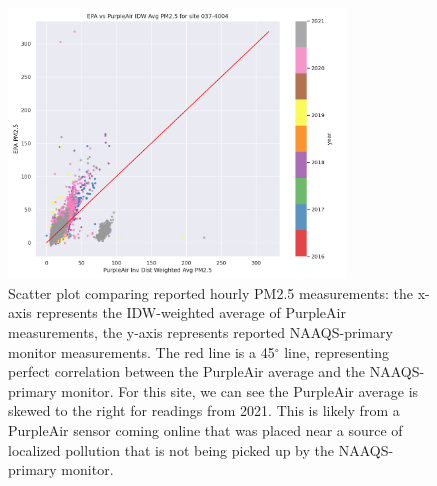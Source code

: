 \documentclass[12pt]{article}
\begin{document}


\FloatBarrier
\begin{figure}[ht]
\centering
\includegraphics[width=0.8\textwidth]{site-037-4004_epa-pa-hourly-plot.png}
\caption{Scatter plot comparing reported hourly PM2.5 measurements: the x-axis represents the IDW-weighted average of PurpleAir measurements, the y-axis represents reported NAAQS-primary monitor measurements. The red line is a 45$^\circ$ line, representing perfect correlation between the PurpleAir average and the NAAQS-primary monitor. For this site, we can see the PurpleAir average is skewed to the right for readings from 2021. This is likely from a PurpleAir sensor coming online that was placed near a source of localized pollution that is not being picked up by the NAAQS-primary monitor.}
\label{fig:pa-epa-compare_037-4004}
\end{figure}


\FloatBarrier
\end{document}

